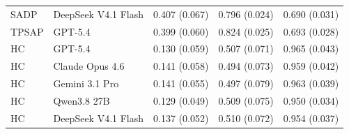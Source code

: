 \begin{table}[pos=!htbp]
\begin{tabular*}{\textwidth}{@{\extracolsep{\fill}}llccc@{}}
SADP & DeepSeek V4.1 Flash & 0.407 (0.067) & 0.796 (0.024) & 0.690 (0.031) \\
TPSAP & GPT-5.4 & 0.399 (0.060) & 0.824 (0.025) & 0.693 (0.028) \\
HC & GPT-5.4 & 0.130 (0.059) & 0.507 (0.071) & 0.965 (0.043) \\
HC & Claude Opus 4.6 & 0.141 (0.058) & 0.494 (0.073) & 0.959 (0.042) \\
HC & Gemini 3.1 Pro & 0.141 (0.055) & 0.497 (0.079) & 0.963 (0.039) \\
HC & Qwen3.8 27B & 0.129 (0.049) & 0.509 (0.075) & 0.950 (0.034) \\
HC & DeepSeek V4.1 Flash & 0.137 (0.052) & 0.510 (0.072) & 0.954 (0.037) \\
\bottomrule
\end{tabular*}
\end{table}

